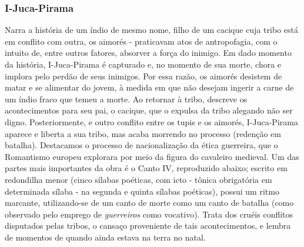 \documentclass[12pt]{book}
\begin{document}
					\subsubsection{I-Juca-Pirama}
					\par Narra a história de um índio de mesmo nome, filho de um cacique cuja tribo está em conflito com outra, os aimorés - praticavam atos de antropofagia, com o intuito de, entre outros fatores, absorver a força do inimigo. Em dado momento da história, I-Juca-Pirama é capturado e, no momento de sua morte, chora e implora pelo perdão de seus inimigos. Por essa razão, os aimorés desistem de matar e se alimentar do jovem, à medida em que não desejam ingerir a carne de um índio fraco que temeu a morte. Ao retornar à tribo, descreve os acontecimentos para seu pai, o cacique, que o expulsa da tribo alegando não ser digno. Posteriormente, e outro conflito entre os tupis e os aimorés, I-Juca-Pirama aparece e liberta a sua tribo, mas acaba morrendo no processo (redenção em batalha). Destacamos o processo de nacionalização da ética guerreira, que o Romantismo europeu explorara por meio da figura do cavaleiro medieval. Um das partes mais importantes da obra é o Canto IV, reproduzido abaixo; escrito em redondilha menor (cinco sílabas poéticas, com icto - tônica obrigatória em determinada sílaba - na segunda e quinta sílabas poéticas), possui um ritmo marcante, utilizando-se de um canto de morte como um canto de batalha (como observado pelo emprego de \textit{guerreiros} como vocativo). Trata dos cruéis conflitos disputados pelas tribos, o cansaço proveniente de tais acontecimentos, e lembra de momentos de quando ainda estava na terra no natal. 
					\settowidth{\versewidth}{Guerreiros, ouvi:}
\end{document}

